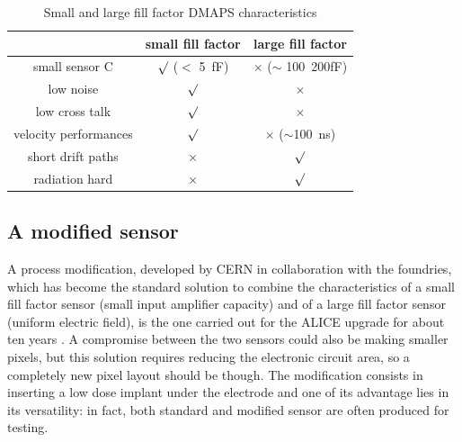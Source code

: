       \begin{table}
         \begin{center}
         \begin{tabular}{|c | c |c |}
         \hline
         & small fill factor & large fill factor\\
         \hline
         \hline
         small sensor C & $\surd$ ($<$ \SI{5}{fF}) & $\times$ ($\sim$ \SI{100}{200}{fF})\\
         low noise & $\surd$ & $\times$\\
         low cross talk & $\surd$ & $\times$ \\
         velocity performances & $\surd$ & $\times$ ($\sim$\SI{100}{ns})\\
         short drift paths & $\times$ & $\surd$ \\
         radiation hard & $\times$ & $\surd$ \\
         \hline
         \end{tabular}
         \caption{Small and large fill factor DMAPS characteristics}
         \label{tab:DMAPS_large_small_fillfactor}
         \end{center}
      \end{table}

   \subsection{A modified sensor}\label{chap:a_modified_sensor}
      A process modification, developed by CERN in collaboration with the foundries, which has become the standard solution to combine the characteristics of a small fill factor sensor (small input amplifier capacity) and of a large fill factor sensor (uniform electric field), is the one carried out for the ALICE upgrade for about ten years \cite{AProcessModification}.
      A compromise between the two sensors could also be making smaller pixels, but this solution requires reducing the electronic circuit area, so a completely new pixel layout should be though. The modification consists in inserting a low dose implant under the electrode and one of its advantage lies in its versatility: in fact, both standard and modified sensor are often produced for testing.

